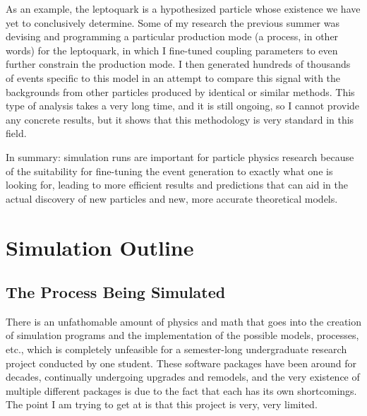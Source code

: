 As an example, the leptoquark is a hypothesized particle whose existence we have yet to conclusively determine. Some of my research the previous summer was devising and programming a particular production mode (a process, in other words) for the leptoquark, in which I fine-tuned coupling parameters to even further constrain the production mode. I then generated hundreds of thousands of events specific to this model in an attempt to compare this signal with the backgrounds from other particles produced by identical or similar methods. This type of analysis takes a very long time, and it is still ongoing, so I cannot provide any concrete results, but it shows that this methodology is very standard in this field.

In summary: simulation runs are important for particle physics research because of the suitability for fine-tuning the event generation to exactly what one is looking for, leading to more efficient results and predictions that can aid in the actual discovery of new particles and new, more accurate theoretical models.



\section{Simulation Outline}

\subsection{The Process Being Simulated}

There is an unfathomable amount of physics and math that goes into the creation of simulation programs and the implementation of the possible models, processes, etc., which is completely unfeasible for a semester-long undergraduate research project conducted by one student. These software packages have been around for decades, continually undergoing upgrades and remodels, and the very existence of multiple different packages is due to the fact that each has its own shortcomings. The point I am trying to get at is that this project is very, very limited.

